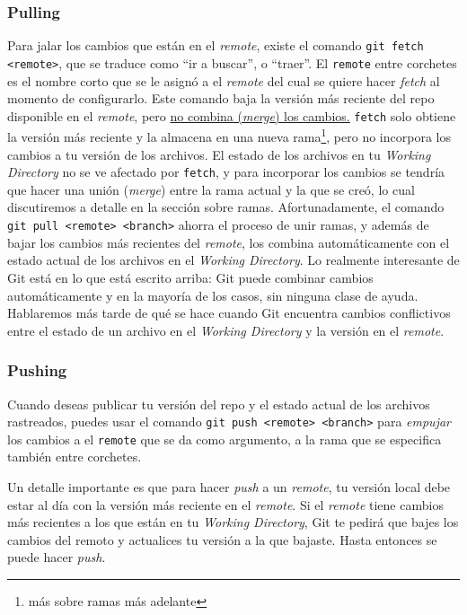 \documentclass[spanish, 12pt, a4paper]{article}
\begin{document}
\subsubsection{Pulling}
Para jalar los cambios que están en el \textit{remote}, existe el comando \texttt{git fetch <remote>}, que se traduce como ``ir a buscar'', o ``traer''.
El \texttt{remote} entre corchetes es el nombre corto que se le asignó a el \textit{remote} del cual se quiere hacer \textit{fetch} al momento de configurarlo.
Este comando baja la versión más reciente del repo disponible en el \textit{remote}, pero \underline{no combina (\textit{merge}) los cambios.}
\texttt{fetch} solo obtiene la versión más reciente y la almacena en una nueva rama\footnote{más sobre ramas más adelante}, pero no incorpora los cambios a tu versión de los archivos.
El estado de los archivos en tu \textit{Working Directory} no se ve afectado por \texttt{fetch}, y para incorporar los cambios se tendría que hacer una unión (\textit{merge}) entre la rama actual y la que se creó, lo cual discutiremos a detalle en la sección sobre ramas.
Afortunadamente, el comando \texttt{git pull <remote> <branch>} ahorra el proceso de unir ramas, y además de bajar los cambios más recientes del \textit{remote}, los combina automáticamente con el estado actual de los archivos en el \textit{Working Directory}.
Lo realmente interesante de Git está en lo que está escrito arriba: Git puede combinar cambios automáticamente y en la mayoría de los casos, sin ninguna clase de ayuda.
Hablaremos más tarde de qué se hace cuando Git encuentra cambios conflictivos entre el estado de un archivo en el \textit{Working Directory} y la versión en el \textit{remote}.

\subsubsection{Pushing}
Cuando deseas publicar tu versión del repo y el estado actual de los archivos rastreados, puedes usar el comando \texttt{git push <remote> <branch>} para \textit{empujar} los cambios a el \texttt{remote} que se da como argumento, a la rama que se especifica también entre corchetes.

Un detalle importante es que para hacer \textit{push} a un \textit{remote}, tu versión local debe estar al día con la versión más reciente en el \textit{remote}.
Si el \textit{remote} tiene cambios más recientes a los que están en tu \textit{Working Directory}, Git te pedirá que bajes los cambios del remoto y actualices tu versión a la que bajaste.
Hasta entonces se puede hacer \textit{push}.
\end{document}
